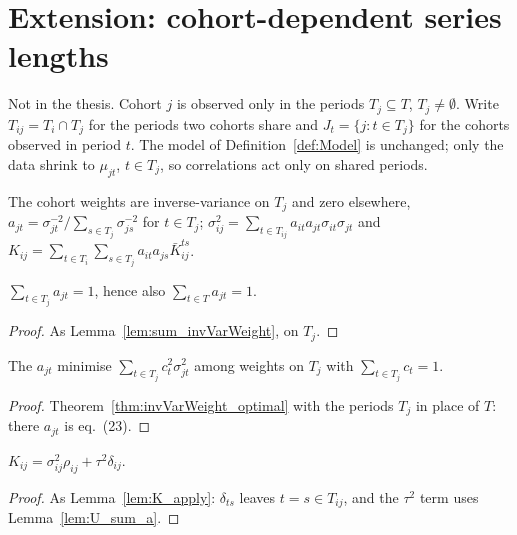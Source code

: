 \chapter{Extension: cohort-dependent series lengths}\label{ch:unequal}

Not in the thesis. Cohort $j$ is observed only in the periods
$T_j \subseteq T$, $T_j \ne \emptyset$. Write $T_{ij} = T_i \cap T_j$ for the
periods two cohorts share and $J_t = \{j : t \in T_j\}$ for the cohorts
observed in period $t$. The model of Definition~\ref{def:Model} is unchanged;
only the data shrink to $\mu_{jt}$, $t \in T_j$, so correlations act only on
shared periods.

\begin{definition}\label{def:Unequal}
  \leanok
  The cohort weights are inverse-variance on $T_j$ and zero elsewhere,
  $a_{jt} = \sigma_{jt}^{-2}/\sum_{s \in T_j}\sigma_{js}^{-2}$ for $t \in T_j$;
  $\sigma^2_{ij} = \sum_{t \in T_{ij}} a_{it}a_{jt}\sigma_{it}\sigma_{jt}$ and
  $K_{ij} = \sum_{t \in T_i}\sum_{s \in T_j} a_{it}a_{js}\bar K^{ts}_{ij}$.
\end{definition}

\begin{lemma}\label{lem:U_sum_a}
  \leanok
  $\sum_{t \in T_j} a_{jt} = 1$, hence also $\sum_{t \in T} a_{jt} = 1$.
\end{lemma}
\begin{proof}
  \leanok
  As Lemma~\ref{lem:sum_invVarWeight}, on $T_j$.
\end{proof}

\begin{theorem}\label{thm:U_a_optimal}
  \leanok
  The $a_{jt}$ minimise $\sum_{t \in T_j} c_t^2\sigma_{jt}^2$ among weights on
  $T_j$ with $\sum_{t\in T_j} c_t = 1$.
\end{theorem}
\begin{proof}
  \leanok
  Theorem~\ref{thm:invVarWeight_optimal} with the periods $T_j$ in place of $T$:
  there $a_{jt}$ is eq.~(23).
\end{proof}

\begin{lemma}[Entries of $K$]\label{lem:U_K_apply}
  \leanok
  $K_{ij} = \sigma^2_{ij}\rho_{ij} + \tau^2\delta_{ij}$.
\end{lemma}
\begin{proof}
  \leanok
  As Lemma~\ref{lem:K_apply}: $\delta_{ts}$ leaves $t = s \in T_{ij}$, and
  the $\tau^2$ term uses Lemma~\ref{lem:U_sum_a}.
\end{proof}

